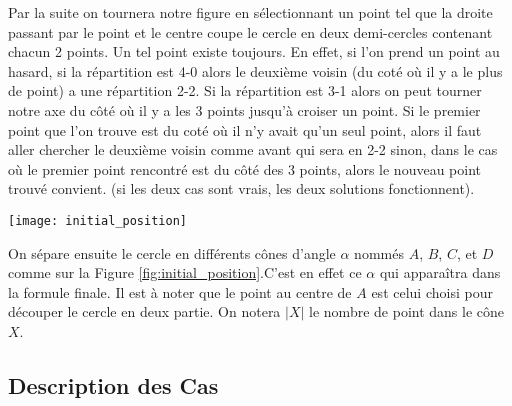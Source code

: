 Par la suite on tournera notre figure en sélectionnant un point tel que la droite passant par le point et le centre coupe le cercle en deux demi-cercles contenant chacun 2 points. Un tel point existe toujours. En effet, si l'on prend un point au hasard, si la répartition est 4-0  alors le deuxième voisin (du coté où il y a le plus de point) a une répartition 2-2. Si la répartition est 3-1 alors on peut tourner notre axe du côté où il y a les 3 points jusqu'à croiser un point. Si le premier point que l'on trouve est du coté où il n'y avait qu'un seul point, alors il faut aller chercher le deuxième voisin comme avant qui sera en 2-2 sinon, dans le cas où le premier point rencontré est du côté des 3 points, alors le nouveau point trouvé convient. (si les deux cas sont vrais, les deux solutions fonctionnent).


  \texttt{[image: initial\_position]}\label{fig:initial_position}

  On sépare ensuite le cercle en différents cônes d'angle $\alpha$ nommés $A$,
  $B$, $C$, et $D$ comme sur la Figure \ref{fig:initial_position}.C'est en
  effet ce $\alpha$ qui apparaîtra dans la formule finale. Il est à noter que le point au centre de $A$ est celui choisi pour découper le cercle en deux partie. On notera $|X|$ le nombre de point dans le cône $X$.

\subsection*{Description des Cas}

